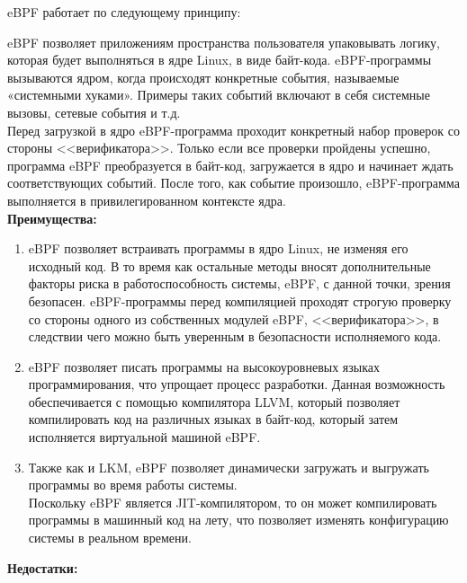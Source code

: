 
eBPF работает по следующему принципу:%

eBPF позволяет приложениям пространства пользователя упаковывать логику, которая будет выполняться в ядре Linux, в виде байт-кода.
eBPF-программы вызываются ядром, когда происходят конкретные события, называемые «системными хуками».
Примеры таких событий включают в себя системные вызовы, сетевые события и т.д.\\
Перед загрузкой в ядро eBPF-программа проходит конкретный набор проверок со стороны <<верификатора>>.
Только если все проверки пройдены успешно, программа eBPF преобразуется в байт-код, загружается в ядро и начинает ждать соответствующих событий.
После того, как событие произошло, eBPF-программа выполняется в привилегированном контексте ядра.\\

\textbf{Преимущества:}

\begin{enumerate}
    \item eBPF позволяет встраивать программы в ядро Linux, не изменяя его исходный код.
    В то время как остальные методы вносят дополнительные факторы риска в работоспособность системы, eBPF, с данной точки, зрения безопасен.
    eBPF-программы перед компиляцией проходят строгую проверку со стороны одного из собственных модулей eBPF, <<верификатора>>, в следствии чего можно быть уверенным в безопасности исполняемого кода.
    \item eBPF позволяет писать программы на высокоуровневых языках программирования, что упрощает процесс разработки.
    Данная возможность обеспечивается с помощью компилятора LLVM, который позволяет компилировать код на различных языках в байт-код, который затем исполняется виртуальной машиной eBPF.
    \item Также как и LKM, eBPF позволяет динамически загружать и выгружать программы во время работы системы. \vspace{1mm}\\
    Поскольку eBPF является JIT-компилятором, то он может компилировать программы в машинный код на лету, что позволяет изменять конфигурацию системы в реальном времени.\\
\end{enumerate}

\textbf{Недостатки:}

